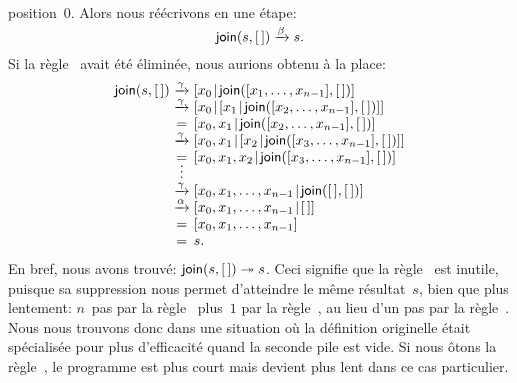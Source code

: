 position~\(0\). Alors nous réécrivons en une étape:
\begin{equation*}
\textsf{join}(s,[\,]) \xrightarrow{\smash{\beta}} s.
\end{equation*}
Si la règle~\clause{\beta} avait été éliminée, nous aurions obtenu à
la place:
\begin{equation*}
\begin{array}{r@{\;}c@{\;}l}
\fun{join}(s,\el)
& \smashedrightarrow{\gamma} &
  \cons{x\sb{0}}{\fun{join}([x\sb{1},\ldots,x\sb{n-1}],\el)}\\
& \smashedrightarrow{\gamma} &
  \cons{x\sb{0}}{\cons{x\sb{1}}{\fun{join}([x\sb{2},\ldots,x\sb{n-1}],\el)}}\\
  & = &
  \cons{x\sb{0},x\sb{1}}{\fun{join}([x\sb{2},\ldots,x\sb{n-1}],\el)}\\
& \smashedrightarrow{\gamma} &
  \cons{x\sb{0},x\sb{1}}{\cons{x\sb{2}}{\fun{join}([x\sb{3},\ldots,x\sb{n-1}],\el)}}\\
  & = &
  \cons{x\sb{0},x\sb{1},x\sb{2}}{\fun{join}([x\sb{3},\ldots,x\sb{n-1}],\el)}\\
& \smash{\vdots} &\\
& \smashedrightarrow{\gamma} &
  \cons{x\sb{0},x\sb{1},\ldots,x\sb{n-1}}{\fun{join}(\el,\el)}\\
& \smashedrightarrow{\alpha} & \cons{x\sb{0},x\sb{1},\ldots,x\sb{n-1}}{\el}\\
  & = &
  [x\sb{0},x\sb{1},\ldots,x\sb{n-1}]\\
& = & s.
\end{array}
\end{equation*}
En bref, nous avons trouvé: \(\textsf{join}(s,[\,]) \twoheadrightarrow s\).
Ceci signifie que la règle~\clause{\beta} est inutile, puisque sa
suppression nous permet d'atteindre le même résultat~\(s\), bien que
plus lentement: \(n\)~pas par la règle~\clause{\gamma} plus~\(1\) par
la règle~\clause{\alpha}, au lieu d'un pas par la
règle~\clause{\beta}. Nous nous trouvons donc dans une situation où la
définition originelle était spécialisée pour plus d'efficacité quand
la seconde pile est vide. Si nous ôtons la règle~\clause{\beta}, le
programme est plus court mais devient plus lent dans ce cas
particulier.

